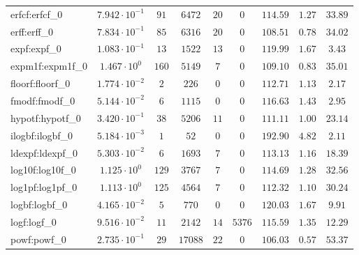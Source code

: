 \begin{tabular}{|l|c|c|c|c|c|c|c|c|}
erfcf:erfcf\_0               & $ 7.942 \cdot 10^{-1} $ & $ 91     $ & $ 6472   $ & $ 20  $ & $ 0    $ & $ 114.59      $ & $ 1.27    $ & $ 33.89   $ \\
erff:erff\_0                 & $ 7.834 \cdot 10^{-1} $ & $ 85     $ & $ 6316   $ & $ 20  $ & $ 0    $ & $ 108.51      $ & $ 0.78    $ & $ 34.02   $ \\
expf:expf\_0                 & $ 1.083 \cdot 10^{-1} $ & $ 13     $ & $ 1522   $ & $ 13  $ & $ 0    $ & $ 119.99      $ & $ 1.67    $ & $ 3.43    $ \\
expm1f:expm1f\_0             & $ 1.467 \cdot 10^{0}  $ & $ 160    $ & $ 5149   $ & $ 7   $ & $ 0    $ & $ 109.10      $ & $ 0.83    $ & $ 35.01   $ \\
floorf:floorf\_0             & $ 1.774 \cdot 10^{-2} $ & $ 2      $ & $ 226    $ & $ 0   $ & $ 0    $ & $ 112.71      $ & $ 1.13    $ & $ 2.17    $ \\
fmodf:fmodf\_0               & $ 5.144 \cdot 10^{-2} $ & $ 6      $ & $ 1115   $ & $ 0   $ & $ 0    $ & $ 116.63      $ & $ 1.43    $ & $ 2.95    $ \\
hypotf:hypotf\_0             & $ 3.420 \cdot 10^{-1} $ & $ 38     $ & $ 5206   $ & $ 11  $ & $ 0    $ & $ 111.11      $ & $ 1.00    $ & $ 23.14   $ \\
ilogbf:ilogbf\_0             & $ 5.184 \cdot 10^{-3} $ & $ 1      $ & $ 52     $ & $ 0   $ & $ 0    $ & $ 192.90      $ & $ 4.82    $ & $ 2.11    $ \\
ldexpf:ldexpf\_0             & $ 5.303 \cdot 10^{-2} $ & $ 6      $ & $ 1693   $ & $ 7   $ & $ 0    $ & $ 113.13      $ & $ 1.16    $ & $ 18.39   $ \\
log10f:log10f\_0             & $ 1.125 \cdot 10^{0}  $ & $ 129    $ & $ 3767   $ & $ 7   $ & $ 0    $ & $ 114.69      $ & $ 1.28    $ & $ 32.56   $ \\
log1pf:log1pf\_0             & $ 1.113 \cdot 10^{0}  $ & $ 125    $ & $ 4564   $ & $ 7   $ & $ 0    $ & $ 112.32      $ & $ 1.10    $ & $ 30.24   $ \\
logbf:logbf\_0               & $ 4.165 \cdot 10^{-2} $ & $ 5      $ & $ 770    $ & $ 0   $ & $ 0    $ & $ 120.03      $ & $ 1.67    $ & $ 9.91    $ \\
logf:logf\_0                 & $ 9.516 \cdot 10^{-2} $ & $ 11     $ & $ 2142   $ & $ 14  $ & $ 5376 $ & $ 115.59      $ & $ 1.35    $ & $ 12.29   $ \\
powf:powf\_0                 & $ 2.735 \cdot 10^{-1} $ & $ 29     $ & $ 17088  $ & $ 22  $ & $ 0    $ & $ 106.03      $ & $ 0.57    $ & $ 53.37   $ \\

\end{tabular}
